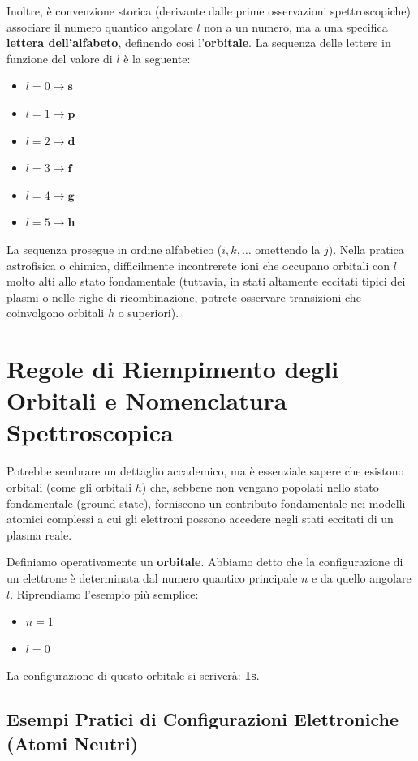 Inoltre, è convenzione storica (derivante dalle prime osservazioni spettroscopiche) associare il numero quantico angolare $l$ non a un numero, ma a una specifica \textbf{lettera dell'alfabeto}, definendo così l'\textbf{orbitale}.
La sequenza delle lettere in funzione del valore di $l$ è la seguente:
\begin{itemize}
\item $l = 0 \longrightarrow \textbf{s}$
\item $l = 1 \longrightarrow \textbf{p}$
\item $l = 2 \longrightarrow \textbf{d}$
\item $l = 3 \longrightarrow \textbf{f}$
\item $l = 4 \longrightarrow \textbf{g}$
\item $l = 5 \longrightarrow \textbf{h}$
\end{itemize}
La sequenza prosegue in ordine alfabetico ($i, k, \ldots$ omettendo la $j$).
Nella pratica astrofisica o chimica, difficilmente incontrerete ioni che occupano orbitali con $l$ molto alti allo stato fondamentale (tuttavia, in stati altamente eccitati tipici dei plasmi o nelle righe di ricombinazione, potrete osservare transizioni che coinvolgono orbitali $h$ o superiori).

\section{Regole di Riempimento degli Orbitali e Nomenclatura Spettroscopica}

Potrebbe sembrare un dettaglio accademico, ma è essenziale sapere che esistono orbitali (come gli orbitali $h$) che, sebbene non vengano popolati nello stato fondamentale (ground state), forniscono un contributo fondamentale nei modelli atomici complessi a cui gli elettroni possono accedere negli stati eccitati di un plasma reale.

Definiamo operativamente un \textbf{orbitale}. Abbiamo detto che la configurazione di un elettrone è determinata dal numero quantico principale $n$ e da quello angolare $l$.
Riprendiamo l'esempio più semplice:
\begin{itemize}
\item $n = 1$
\item $l = 0$
\end{itemize}
La configurazione di questo orbitale si scriverà: \textbf{1s}.

\subsection{Esempi Pratici di Configurazioni Elettroniche (Atomi Neutri)}

